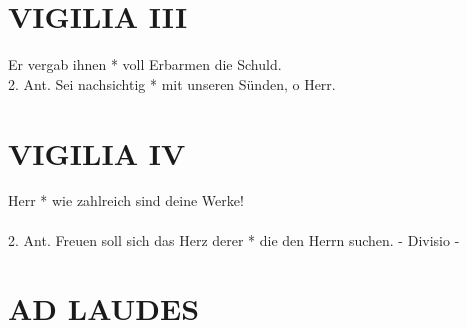 \begin{flushleft}


\end{flushleft}


\section{VIGILIA III}

\begin{sloppypar}
{ Er vergab ihnen * voll Erbarmen die Schuld. \\
2. Ant. Sei nachsichtig * mit unseren Sünden, o Herr. \\}
\end{sloppypar}

\begin{flushleft}


\end{flushleft}


\section{VIGILIA IV}

\begin{sloppypar}
{ Herr * wie zahlreich sind deine Werke! \\ \\
2. Ant. Freuen soll sich das Herz derer * die den Herrn suchen.  - Divisio -  }\\ 

\end{sloppypar}

\begin{flushleft}


\end{flushleft}



\section[LAUDES]{AD LAUDES}

\def\greinitialformat#1{{\fontsize{40}{40}\selectfont #1}}
\gresetfirstlineaboveinitial{\small \textcolor{red}{Ps 76}}{}
\setaboveinitialseparation{0.72mm}

